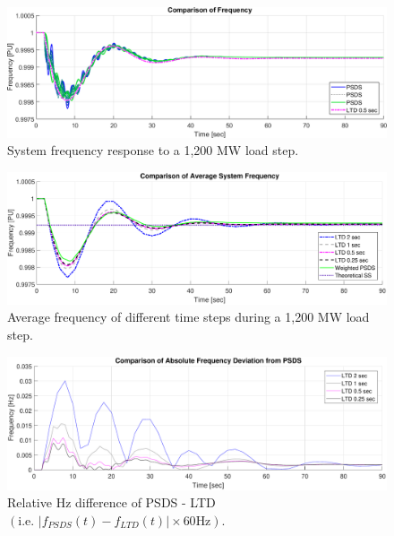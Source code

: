 \documentclass[12pt]{article}
\begin{document}
\pagebreak
\newcommand{\figW}{1}
	\begin{figure}[h!]
			\centering
			\includegraphics[width=\figW\linewidth]{fComp}\vspace{-.5em}
			\caption{System frequency response to a 1,200 MW load step.}
			\label{systemf}		 
	\end{figure}%
	\begin{figure}[h!]
			\centering
			\includegraphics[width=\figW\linewidth]{tsWComp}\vspace{-.5em}
			\caption{Average frequency of different time steps during a 1,200 MW load step.}
			\label{tsComp}		 
	\end{figure}%

	\begin{figure}[h!]
			\centering
			\includegraphics[width=\figW\linewidth]{tsWCompRelF}\vspace{-.5em}
			\caption{Relative Hz difference of PSDS - LTD $\left( \text{i.e. }  \left|f_{PSDS}(t)- f_{LTD}(t)\right| \times 60 \text{Hz} \right)$.}
			\label{relF}		 
	\end{figure}%
\end{document}
